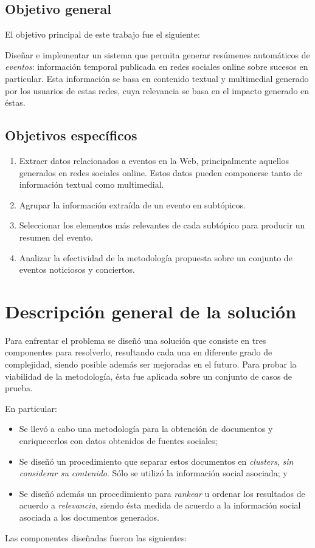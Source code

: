 \subsection{Objetivo general}
\label{sec-1.2.1}


    El objetivo principal de este trabajo fue el siguiente:

    Diseñar e implementar un sistema que permita generar resúmenes
    automáticos de \emph{eventos}: información temporal publicada en redes
    sociales online sobre sucesos en particular. Esta información se
    basa en contenido textual y multimedial generado por los usuarios
    de estas redes, cuya relevancia se basa en el impacto generado en
    éstas.


\subsection{Objetivos específicos}
\label{sec-1.2.2}


\begin{enumerate}
\item Extraer datos relacionados a eventos en la Web, principalmente
       aquellos generados en redes sociales online. Estos datos pueden
       componerse tanto de información textual como multimedial.
\item Agrupar la información extraída de un evento en subtópicos.
\item Seleccionar los elementos más relevantes de cada subtópico para
       producir un resumen del evento.
\item Analizar la efectividad de la metodología propuesta sobre un
       conjunto de eventos noticiosos y conciertos.
\end{enumerate}
\section{Descripción general de la solución}
\label{sec-1.3}


   Para enfrentar el problema se diseñó una solución que consiste en
   tres componentes para resolverlo, resultando cada una en diferente
   grado de complejidad, siendo posible además ser mejoradas en el
   futuro. Para probar la viabilidad de la metodología, ésta fue
   aplicada sobre un conjunto de casos de prueba.

   En particular:

\begin{itemize}
\item Se llevó a cabo una metodología para la obtención de documentos y
     enriquecerlos con datos obtenidos de fuentes sociales;
\item Se diseñó un procedimiento que separar estos documentos en
     \emph{clusters}, \emph{sin considerar su contenido}. Sólo se utilizó la
     información social asociada; y
\item Se diseñó además un procedimiento para \emph{rankear} u ordenar los
     resultados de acuerdo a \emph{relevancia}, siendo ésta medida de
     acuerdo a la información social asociada a los documentos
     generados.
\end{itemize}
   Las componentes diseñadas fueron las siguientes:

